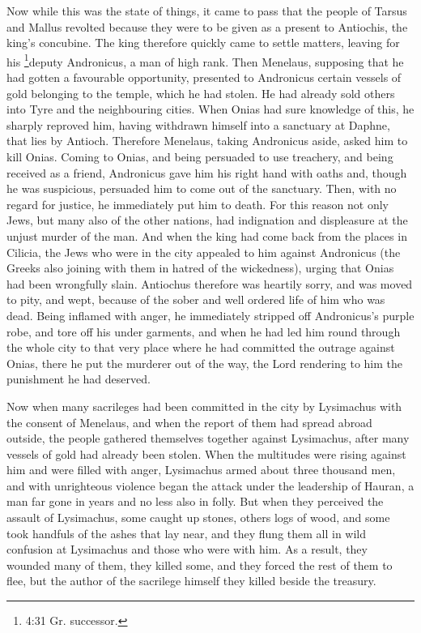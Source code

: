  Now while this was the state of things, it came to pass
that the people of Tarsus and Mallus revolted because they were to be
given as a present to Antiochis, the king's concubine.  The
king therefore quickly came to settle matters, leaving for his
\footnote{4:31 Gr. successor.}deputy Andronicus, a man of high rank.
 Then Menelaus, supposing that he had gotten a favourable
opportunity, presented to Andronicus certain vessels of gold belonging
to the temple, which he had stolen. He had already sold others into Tyre
and the neighbouring cities.  When Onias had sure knowledge
of this, he sharply reproved him, having withdrawn himself into a
sanctuary at Daphne, that lies by Antioch.  Therefore
Menelaus, taking Andronicus aside, asked him to kill Onias. Coming to
Onias, and being persuaded to use treachery, and being received as a
friend, Andronicus gave him his right hand with oaths and, though he was
suspicious, persuaded him to come out of the sanctuary. Then, with no
regard for justice, he immediately put him to death.  For
this reason not only Jews, but many also of the other nations, had
indignation and displeasure at the unjust murder of the man.
 And when the king had come back from the places in
Cilicia, the Jews who were in the city appealed to him against
Andronicus (the Greeks also joining with them in hatred of the
wickedness), urging that Onias had been wrongfully slain. 
Antiochus therefore was heartily sorry, and was moved to pity, and wept,
because of the sober and well ordered life of him who was dead.
 Being inflamed with anger, he immediately stripped off
Andronicus's purple robe, and tore off his under garments, and when he
had led him round through the whole city to that very place where he had
committed the outrage against Onias, there he put the murderer out of
the way, the Lord rendering to him the punishment he had deserved.

 Now when many sacrileges had been committed in the city by
Lysimachus with the consent of Menelaus, and when the report of them had
spread abroad outside, the people gathered themselves together against
Lysimachus, after many vessels of gold had already been stolen.
 When the multitudes were rising against him and were
filled with anger, Lysimachus armed about three thousand men, and with
unrighteous violence began the attack under the leadership of Hauran, a
man far gone in years and no less also in folly.  But when
they perceived the assault of Lysimachus, some caught up stones, others
logs of wood, and some took handfuls of the ashes that lay near, and
they flung them all in wild confusion at Lysimachus and those who were
with him.  As a result, they wounded many of them, they
killed some, and they forced the rest of them to flee, but the author of
the sacrilege himself they killed beside the treasury.

